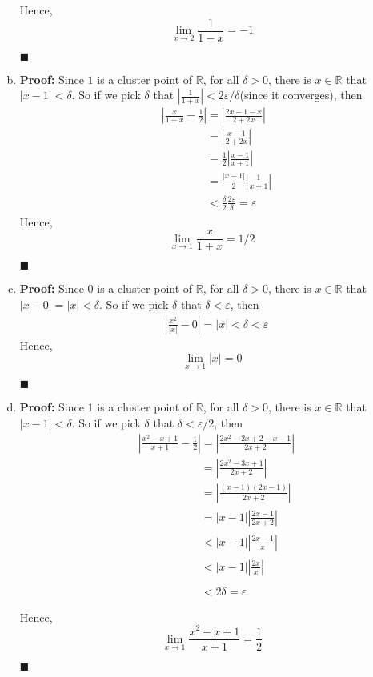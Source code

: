 \documentclass[11pt]{article}
\newcommand{\qed}{
	\begin{flushright}
		$\blacksquare$
	\end{flushright}}
\begin{document}
\begin{enumerate}[(a)]
			Hence, \[\lim_{x\rightarrow	2}\frac{1}{1-x} = -1\]
			\qed
			\item \textbf{Proof:}
				Since $1$ is a cluster point of $\mathbb{R}$, for all $\delta > 0$, there is $x \in \mathbb{R}$ that $|x - 1| < \delta$. So if we pick $\delta$ that $|\frac{1}{1+x}| < 2\varepsilon / \delta$(since it converges), then 
				\begin{align}
					&|\frac{x}{1+x} - \frac{1}{2}| = |\frac{2x - 1 - x}{2 + 2x}|\nonumber\\
					&\phantom{|\frac{x}{1+x} - \frac{1}{2}|} = |\frac{x - 1}{2 + 2x}|\nonumber\\
					&\phantom{|\frac{x}{1+x} - \frac{1}{2}|} = \frac{1}{2}|\frac{x - 1}{x + 1}|\nonumber\\
					&\phantom{|\frac{x}{1+x} - \frac{1}{2}|} = \frac{|x - 1|}{2}|\frac{1}{x + 1}|\nonumber\\
					&\phantom{|\frac{x}{1+x} - \frac{1}{2}|} < \frac{\delta}{2}\frac{2\varepsilon}{\delta} = \varepsilon\nonumber
				\end{align}
				Hence, \[\lim_{x\rightarrow	1}\frac{x}{1+x} = 1/2\]
				\qed
			\item \textbf{Proof:}
				Since $0$ is a cluster point of $\mathbb{R}$, for all $\delta > 0$, there is $x \in \mathbb{R}$ that $|x - 0| = |x| < \delta$. So if we pick $\delta$ that $\delta < \varepsilon$, then
				\begin{align}
					&|\frac{x^2}{|x|} - 0| = |x| < \delta < \varepsilon\nonumber
				\end{align}
				Hence, \[\lim_{x\rightarrow	1}|x| = 0\]
				\qed
			\item \textbf{Proof:} 
				Since $1$ is a cluster point of $\mathbb{R}$, for all $\delta > 0$, there is $x \in \mathbb{R}$ that $|x - 1|  < \delta$. So if we pick $\delta$ that $\delta < \varepsilon / 2$, then
			\begin{align}
				&|\frac{x^2 - x + 1}{x + 1} - \frac{1}{2}| = |\frac{2x^2 - 2x + 2 - x - 1}{2x + 2}|\nonumber\\
				&\phantom{|\frac{x^2 - x + 1}{x + 1} - \frac{1}{2}|} = |\frac{2x^2 - 3x + 1	}{2x + 2}|\nonumber\\
				&\phantom{|\frac{x^2 - x + 1}{x + 1} - \frac{1}{2}|} = |\frac{(x - 1)(2x - 1)}{2x + 2}|\nonumber\\
				&\phantom{|\frac{x^2 - x + 1}{x + 1} - \frac{1}{2}|} = |x - 1||\frac{2x - 1}{2x + 2}|\nonumber\\
				&\phantom{|\frac{x^2 - x + 1}{x + 1} - \frac{1}{2}|} < |x - 1||\frac{2x - 1}{x}|\nonumber\\
				&\phantom{|\frac{x^2 - x + 1}{x + 1} - \frac{1}{2}|} < |x - 1||\frac{2x}{x}|\nonumber\\
				&\phantom{|\frac{x^2 - x + 1}{x + 1} - \frac{1}{2}|} < 2\delta = \varepsilon \nonumber\\
			\end{align}
			Hence, \[\lim_{x\rightarrow	1}\frac{x^2 - x + 1}{x + 1} = \frac{1}{2}\]
				\qed
		\end{enumerate}
\end{document}
